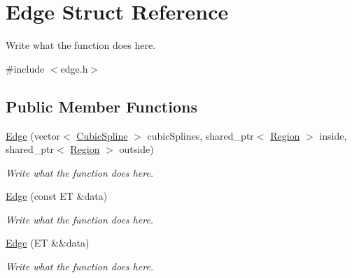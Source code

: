 \hypertarget{structEdge}{\section{Edge Struct Reference}
\label{structEdge}
}


Write what the function does here.  




{\ttfamily \#include $<$edge.\+h$>$}

\subsection*{Public Member Functions}
\begin{DoxyCompactItemize}
\item 
\hyperlink{structEdge_ae88b2eacc8420832ac0b4642e42177f1}{Edge} (vector$<$ \hyperlink{structCubicSpline}{Cubic\+Spline} $>$ cubic\+Splines, shared\+\_\+ptr$<$ \hyperlink{structRegion}{Region} $>$ inside, shared\+\_\+ptr$<$ \hyperlink{structRegion}{Region} $>$ outside)
\begin{DoxyCompactList}\small\item\em Write what the function does here. \end{DoxyCompactList}\item 
\hyperlink{structEdge_a0ce57088d28633e658a1067d9bb52e31}{Edge} (const E\+T \&data)
\begin{DoxyCompactList}\small\item\em Write what the function does here. \end{DoxyCompactList}\item 
\hyperlink{structEdge_a4eb6ebfe7757f44032c4add227d94544}{Edge} (E\+T \&\&data)
\begin{DoxyCompactList}\small\item\em Write what the function does here. \end{DoxyCompactList}\end{DoxyCompactItemize}
